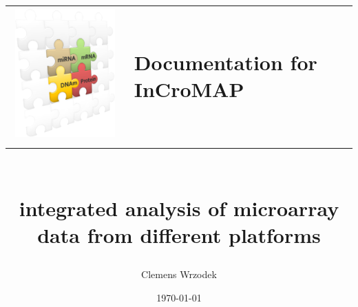 \documentclass[
  BCOR12mm,
  letterpaper,
  11pt,
  headsepline,
  pointlessnumbers,
  tablecaptionabove,
  onelinecaption,
  headinclude,
  appendixprefix,
  idxtotoc,
  bibtotoc,
  twoside,
  titlepage
]{scrreprt}
\title{
\centering
\begin{tabular}{C{5cm}L{5cm}}
\includegraphics[width=0.35\columnwidth]{figures/puzzle_logo.png} & Documentation for InCroMAP \\
\end{tabular}
\\ \vspace{5mm} \large{integrated analysis of microarray data from different platforms}\\
}
\author{Clemens Wrzodek}
\date{\today}
\begin{document}

\maketitle
\begin{abstract}

\end{abstract}

\setcounter{tocdepth}{1}
\tableofcontents		%

\cleardoublepage		%











\end{document}
